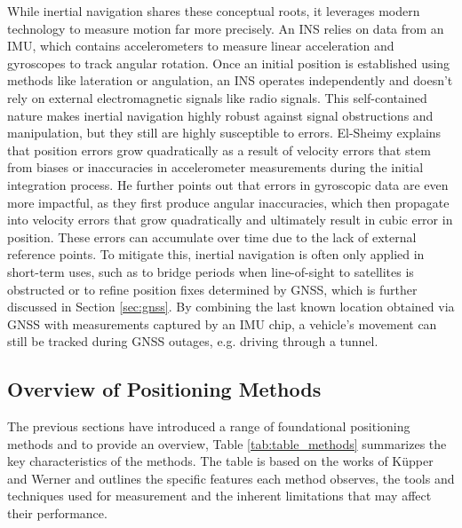 While inertial navigation shares these conceptual roots, it leverages modern technology to measure motion far more precisely. 
An \ac{INS} relies on data from an \ac{IMU}, which contains accelerometers to measure linear acceleration and gyroscopes to track angular rotation. 
Once an initial position is established using methods like lateration or angulation, an \acs{INS} operates independently and doesn't rely on external electromagnetic signals like radio signals. 
This self-contained nature makes inertial navigation highly robust against signal obstructions and manipulation, but they still are highly susceptible to errors.
El-Sheimy \cite{sheimy2006ins} explains that position errors grow quadratically as a result of velocity errors that stem from biases or inaccuracies in accelerometer measurements during the initial integration process. 
He further points out that errors in gyroscopic data are even more impactful, as they first produce angular inaccuracies, which then propagate into velocity errors that grow quadratically and ultimately result in cubic error in position. 
These errors can accumulate over time due to the lack of external reference points. 
To mitigate this, inertial navigation is often only applied in short-term uses, such as to bridge periods when line-of-sight to satellites is obstructed or to refine position fixes determined by \ac{GNSS}, which is further discussed in Section \ref{sec:gnss}. 
By combining the last known location obtained via \acs{GNSS} with measurements captured by an \acs{IMU} chip, a vehicle's movement can still be tracked during GNSS outages, e.g. driving through a tunnel.

\subsection{Overview of Positioning Methods}
The previous sections have introduced a range of foundational positioning methods and to provide an overview, Table \ref{tab:table_methods} summarizes the key characteristics of the methods. 
The table is based on the works of K\"upper \cite{kupper2005location} and Werner \cite{werner2014indoor} and outlines the specific features each method observes, the tools and techniques used for measurement and the inherent limitations that may affect their performance.

